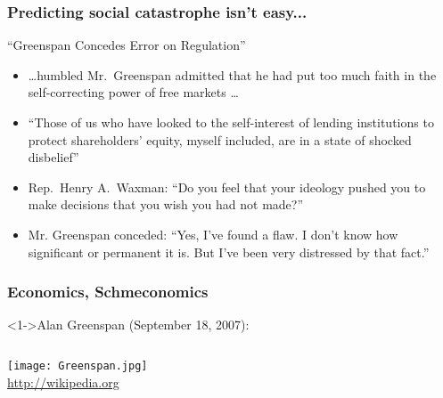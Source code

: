 \begin{frame}
  \frametitle{Predicting social catastrophe isn't easy...}

  \begin{block}{``Greenspan Concedes Error on Regulation''}
    \begin{itemize}
    \item<2->
      \ldots humbled Mr.\ Greenspan admitted that he had put too much
      faith in the self-correcting power of free markets \ldots
    \item<3->
      ``Those of us who have looked to the self-interest of lending
      institutions to protect shareholders' equity, myself included,
      are in a state of shocked disbelief''
    \item<4-> 
      Rep.\ Henry
      A.\ Waxman: ``Do you feel
      that your ideology pushed you to make decisions that you wish
      you had not made?''
    \item<5-> 
      Mr. Greenspan conceded: ``Yes, I've found a flaw. I don't know
      how significant or permanent it is. But I've been very
      distressed by that fact.''
    \end{itemize}
  \end{block}


\end{frame}


\begin{frame}
  \frametitle{Economics, Schmeconomics}  

  \begin{block}<1->{Alan Greenspan (September 18, 2007):}
    \medskip
    \begin{columns}

      \medskip

      \medskip

      \medskip
      \texttt{[image: Greenspan.jpg]}\\
      \tiny{\url{http://wikipedia.org}}
    \end{columns}
  \end{block}

\end{frame}


